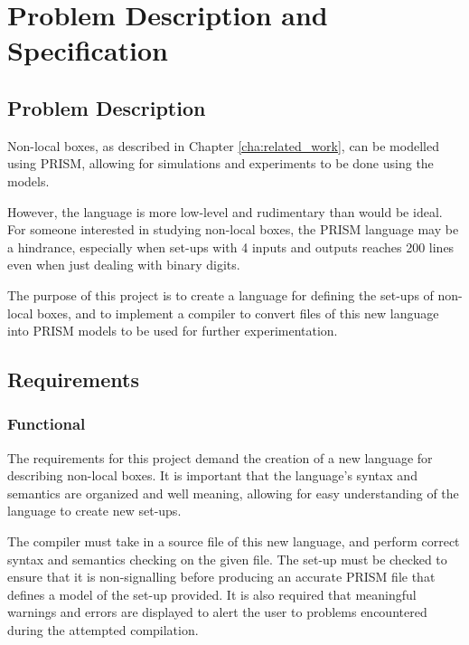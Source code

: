 \documentclass[report.tex]{subfiles}
\begin{document}
\chapter{Problem Description and Specification} %
\label{cha:problem_description_and_specification}


\section{Problem Description} %
\label{sec:problem_description}
Non-local boxes, as described in Chapter \ref{cha:related_work}, can be modelled
using PRISM, allowing for simulations and experiments to be done using the
models. 

However, the language is more low-level and rudimentary than would be ideal.
For someone interested in studying non-local boxes, the PRISM language may be a
hindrance, especially when set-ups with 4 inputs and outputs reaches 200 lines
even when just dealing with binary digits.

The purpose of this project is to create a language for defining the set-ups of
non-local boxes, and to implement a compiler to convert files of this new
language into PRISM models to be used for further experimentation.


\section{Requirements} %
\label{sec:requirements}

\subsection{Functional} %
\label{sub:functional}
The requirements for this project demand the creation of a new language for
describing non-local boxes. It is important that the language's syntax and
semantics are organized and well meaning, allowing for easy understanding of the
language to create new set-ups.

The compiler must take in a source file of this new language, and perform
correct syntax and semantics checking on the given file. The set-up must be
checked to ensure that it is non-signalling before producing an accurate PRISM
file that defines a model of the set-up provided. It is also required that
meaningful warnings and errors are displayed to alert the user to problems
encountered during the attempted compilation.
\end{document}
